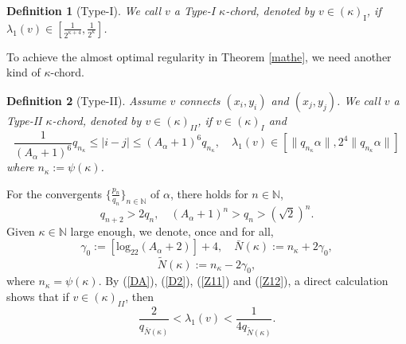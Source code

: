 \documentclass{amsart}
\newtheorem{Definition}{Definition}[section]
\theoremstyle{definition}
\begin{document}
\begin{Definition}[Type-I]\label{kvec1}
	We call $v$ a Type-I $\kappa$-chord, denoted by $v\in (\kappa)_{\text{I}}$, if  $\lambda_1(v)\in [\frac{1}{2^{\kappa+4}},\frac{1}{2^\kappa}]$.
\end{Definition}
To achieve the almost optimal regularity in Theorem \ref{mathe}, we need another kind of $\kappa$-chord.
\begin{Definition}[Type-II]\label{kvec3}
	Assume $v$ connects $(x_i,y_i)$ and  $(x_j,y_j)$. We call $v$ a Type-II $\kappa$-chord, denoted by $v\in (\kappa)_{II}$, if $v\in (\kappa)_{I}$ and
	\[{\frac{1}{(A_{\alpha}+1)^6}q_{n_\kappa}\leq|i-j|\leq (A_{\alpha}+1)^6q_{n_\kappa},\quad \lambda_1(v)\in [\|q_{n_\kappa}\alpha\|,2^4\|q_{n_\kappa}\alpha\|]}\]  where $n_{\kappa}:=\psi(\kappa)$.
\end{Definition}
For the  convergents $\{\frac{p_n}{q_n}\}_{n\in \mathbb{N}}$ of $\alpha$, there holds for $n\in\mathbb{N}$,
\begin{equation}\label{D2}
q_{n+2}> 2q_n,\quad (A_\alpha+1)^n>q_n> (\sqrt{2})^n.
\end{equation}
Given $\kappa\in \mathbb{N}$ large enough,
we denote, once and for all,
\begin{equation}\label{Z11}
\gamma_0:=\left[\mathrm{log}_22(A_\alpha+2)\right]+4,\quad \bar{N}(\kappa):=n_\kappa+2\gamma_0,
\end{equation}
\begin{equation}\label{Z12}
\tilde{N}(\kappa):=n_\kappa-2\gamma_0,
\end{equation}
where $n_\kappa=\psi(\kappa)$.
By (\ref{DA}), (\ref{D2}), (\ref{Z11}) and (\ref{Z12}), a direct calculation shows that if $v\in (\kappa)_{II}$, then
\begin{equation}\label{Z13}
\frac{2}{q_{\bar{N}(\kappa)}}<\lambda_1(v)<\frac{1}{4q_{\tilde{N}(\kappa)}}.
\end{equation}
\end{document}
